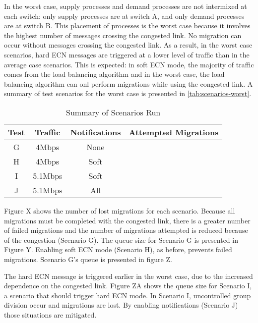 In the worst case, supply processes and demand processes are not intermixed at each switch: only supply processes are at switch A, and only demand processes are at switch B.
This placement of processes is the worst case because it involves the highest number of messages crossing the congested link.
No migration can occur without messages crossing the congested link.
As a result, in the worst case scenarios, hard \ac{ECN} messages are triggered at a lower level of traffic than in the average case scenarios.
This is expected: in soft \ac{ECN} mode, the majority of traffic comes from the load balancing algorithm and in the worst case, the load balancing algorithm can onl perform migrations while using the congested link.
A summary of test scenarios for the worst case is presented in \ref{tab:scenarios-worst}.

\begin{table}
\centering
\caption{Summary of Scenarios Run}
\begin{tabular}{| c | c | c | c |}
    \hline
    Test & Traffic & Notifications & Attempted Migrations \\ \hline
    G & 4Mbps & None &  \\ \hline
    H & 4Mbps & Soft &  \\ \hline
    I & 5.1Mbps & Soft & \\ \hline
    J & 5.1Mbps & All &  \\ \hline
\end{tabular}
\label{tab:scenarios}
\end{table}

Figure X shows the number of lost migrations for each scenario.
Because all migrations must be completed with the congested link, there is a greater number of failed migrations and the number of migrations attempted is reduced because of the congestion (Scenario G).
The queue size for Scenario G is presented in Figure Y.
Enabling soft ECN mode (Scenario H), as before, prevents failed migrations.
Scenario G's queue is presented in figure Z.

The hard ECN message is triggered earlier in the worst case, due to the increased dependence on the congested link.
Figure ZA shows the queue size for Scenario I, a scenario that should trigger hard ECN mode.
In Scenario I, uncontrolled group division occur and migrations are lost.
By enabling notifications (Scenario J) those situations are mitigated.
